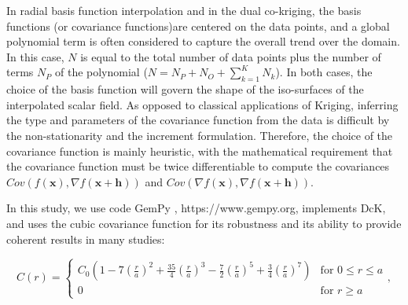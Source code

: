 \documentclass[final]{ring20}
\newcommand{\bx}{\mathbf{x}}
\begin{document}
In radial basis function interpolation \citep[RBF, ][]{Carr2001,Cowan2002ASGMEM,Hillier2014MG} and in the dual co-kriging, the basis functions (or covariance functions)are centered on the data points, and a global polynomial term is often considered to capture the overall trend over the domain. In this case, $N$ is equal to the total number of data points plus the number of terms $N_P$ of the polynomial ($N = N_P + N_O + \sum_{k=1}^{K}{N_k}$). In both cases, the choice of the basis function will govern the shape of the iso-surfaces of the interpolated scalar field. As opposed to classical applications of Kriging, inferring the type and parameters of the covariance function from the data is difficult by the non-stationarity and the increment formulation. Therefore, the choice of the covariance function is mainly heuristic, with the mathematical requirement that the covariance function must be twice differentiable to compute the covariances $Cov\left(f(\bx), \nabla {f}(\bx+\mathbf{h})\right)$ and $Cov\left(\nabla f(\bx), \nabla f(\bx+\mathbf{h})\right)$. 

In this study, we use code GemPy \cite{delaVarga2018GMDD}, https://www.gempy.org, implements DcK, and uses the cubic covariance function for its  robustness and its ability to provide coherent results in many studies: 

\begin{equation}
C(r) = \begin{cases}
C_0(1-7(\frac{r}{a})^2+ \frac{35}{4}(\frac{r}{a})^3
- \frac{7}{2}(\frac{r}{a})^5 +\frac{3}{4}(\frac{r}{a})^7) &
\text{for } 0  \leq r \leq a \\
0 & \text{for } r  \geq a
\end{cases},
\end{equation}
\end{document}
